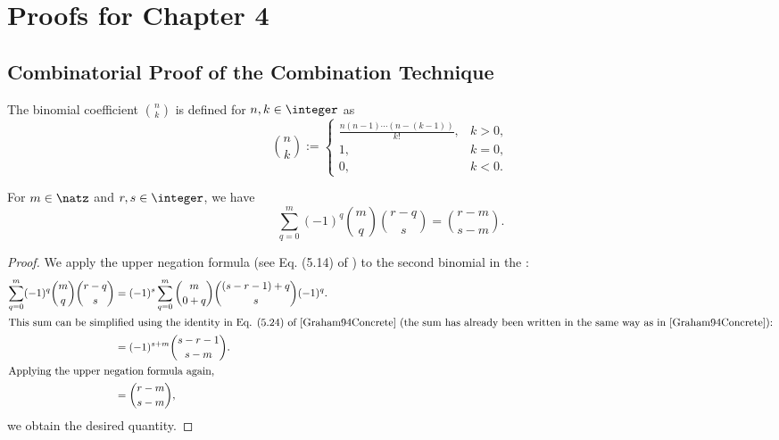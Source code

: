 \section{Proofs for Chapter 4}

\printornamentsfalse
\subsection{Combinatorial Proof of the Combination Technique}
\label{sec:proofCombiTechnique}
\printornamentstrue

\begin{definition}
  \label{def:binomialCoefficient}
  The binomial coefficient $\binom{n}{k}$ is defined for
  $n, k \in \integer$ as
  \begin{equation}
    \binom{n}{k}
    :=
    \begin{cases}
      \frac{n (n - 1) \dotsm (n - (k-1))}{k!},&k > 0,\\
      1,&k = 0,\\
      0,&k < 0.
    \end{cases}
  \end{equation}
\end{definition}

\begin{lemma}
  \label{lemma:inclusionExclusionCountingLemma}
  For $m \in \natz$ and $r, s \in \integer$, we have
  \begin{equation}
    \sum_{q=0}^m (-1)^q \binom{m}{q} \binom{r-q}{s}
    = \binom{r-m}{s-m}.
  \end{equation}
\end{lemma}

\begin{proof}
  We apply the upper negation formula
  (see Eq. (5.14) of \cite{Graham94Concrete})
  to the second binomial in the \lhs:
  \begin{subequations}
    \begin{align}
      \sum_{q=0}^m (-1)^q \binom{m}{q} \binom{r-q}{s}
      &= (-1)^s \sum_{q=0}^m \binom{m}{0+q} \binom{(s-r-1)+q}{s} (-1)^q.\\
      \intertext{%
        This sum can be simplified using the identity
        in Eq. (5.24) of \cite{Graham94Concrete}
        (the sum has already been written in the same way as in
        \cite{Graham94Concrete}):%
      }
      &= (-1)^{s+m} \binom{s-r-1}{s-m}.\\
      \intertext{%
        Applying the upper negation formula again,%
      }
      &= \binom{r-m}{s-m},
    \end{align}
  \end{subequations}
  we obtain the desired quantity.
\end{proof}

